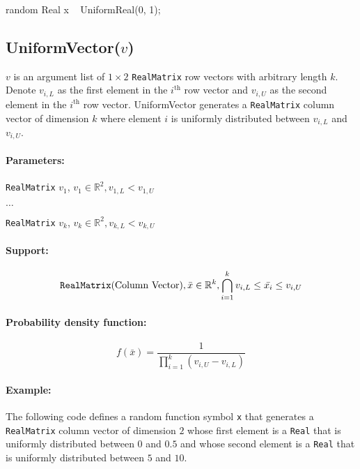 \begin{blogcode}
random Real x ~ UniformReal(0, 1);
\end{blogcode}

\subsection{UniformVector($v$)}

$v$ is an argument list of $1 \times 2$ \verb|RealMatrix| row vectors with arbitrary length $k$. Denote $v_{i,L}$ as the first element in the $i^{\text{th}}$ row vector and $v_{i, U}$ as the second element in the $i^{\text{th}}$ row vector. UniformVector generates a \verb|RealMatrix| column vector of dimension $k$ where element $i$ is uniformly distributed between $v_{i,L}$ and $v_{i,U}$.

\paragraph*{Parameters:} 
\begin{itemize*}
\item[] \verb|RealMatrix| $v_{1}$, $v_{1} \in \mathbb{R}^{2}, v_{1,L} < v_{1,U}$
\item[] $\ldots$
\item[] \verb|RealMatrix| $v_{k}$, $v_{k} \in \mathbb{R}^{2}, 
v_{k,L} < v_{k,U}$

\end{itemize*}

\paragraph*{Support:} 
$$
\verb|RealMatrix| \text{(Column Vector)}, 
\bar{x} \in \mathbb{R}^{k}, \bigcap_{i=1}^{k} v_{i,L} \leq \bar{x_{i}} \leq v_{i,U}  
$$

\paragraph*{Probability density function:}
\[
	f(\bar{x}) = \frac{1}{\prod_{i=1}^{k} (v_{i,U} - v_{i,L})}
\]

\paragraph*{Example:}
The following code defines a random function symbol \verb|x| that generates a \verb|RealMatrix| column vector of dimension $2$ whose first element is a \verb|Real| that is uniformly distributed between $0$ and $0.5$ and whose second element is a \verb|Real| that is uniformly distributed between $5$ and $10$.

